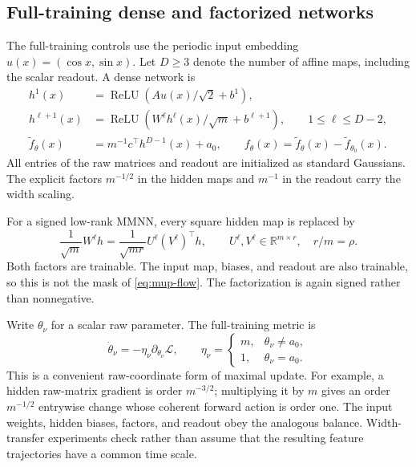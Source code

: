 \documentclass[11pt]{article}
\newcommand{\R}{\mathbb R}
\newcommand{\1}{\mathbf 1}
\newcommand{\ReLU}{\operatorname{ReLU}}
\newcommand{\cL}{\mathcal L}
\theoremstyle{plain}
\theoremstyle{definition}
\begin{document}
\subsection{Full-training dense and factorized networks}
\label{sec:full-model}

The full-training controls use the periodic input embedding
\(u(x)=(\cos x,\sin x)\).  Let \(D\geq3\) denote the number of affine maps,
including the scalar readout.  A dense network is
\begin{align}
 h^1(x)&=\ReLU\!\left(Au(x)/\sqrt2+b^1\right),
 \label{eq:full-first}\\
 h^{\ell+1}(x)&=\ReLU\!\left(W^\ell h^\ell(x)/\sqrt m
 +b^{\ell+1}\right),\qquad 1\leq\ell\leq D-2,\\
 \widetilde f_\theta(x)&=m^{-1}c^\top h^{D-1}(x)+a_0,
 \qquad f_\theta(x)=\widetilde f_\theta(x)-\widetilde f_{\theta_0}(x).
 \label{eq:full-output}
\end{align}
All entries of the raw matrices and readout are initialized as standard
Gaussians.  The explicit factors \(m^{-1/2}\) in the hidden maps and
\(m^{-1}\) in the readout carry the width scaling.

For a signed low-rank MMNN, every square hidden map is replaced by
\begin{equation}
 \frac1{\sqrt m}W^\ell h
 =\frac1{\sqrt{mr}}U^\ell(V^\ell)^\top h,
 \qquad U^\ell,V^\ell\in\R^{m\times r},\quad r/m=\rho.
 \label{eq:full-factor}
\end{equation}
Both factors are trainable.  The input map, biases, and readout are also
trainable, so this is not the mask of \cref{eq:mup-flow}.  The factorization
is again signed rather than nonnegative.

Write \(\theta_\nu\) for a scalar raw parameter.  The full-training metric is
\begin{equation}
 \dot\theta_\nu=-\eta_\nu\partial_{\theta_\nu}\cL,
 \qquad
 \eta_\nu=\begin{cases}m,&\theta_\nu\neq a_0,\\1,&\theta_\nu=a_0.
 \end{cases}
 \label{eq:full-metric}
\end{equation}
This is a convenient raw-coordinate form of maximal update.  For example,
a hidden raw-matrix gradient is order \(m^{-3/2}\); multiplying it by \(m\)
gives an order \(m^{-1/2}\) entrywise change whose coherent forward action
is order one.  The input weights, hidden biases, factors, and readout obey
the analogous balance.  Width-transfer experiments check rather than assume
that the resulting feature trajectories have a common time scale.
\end{document}
